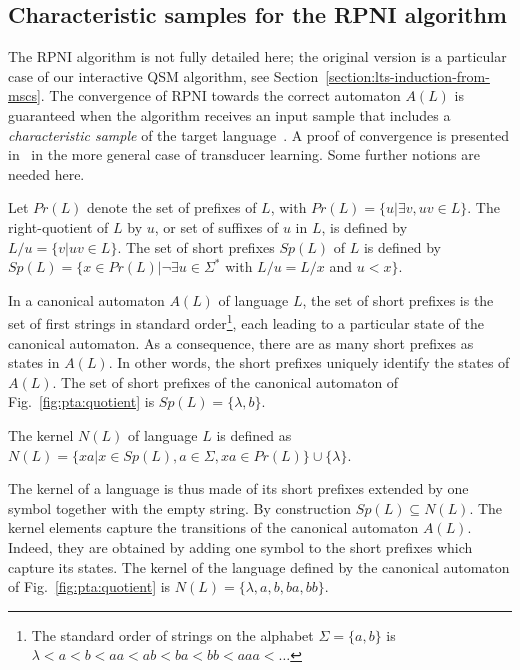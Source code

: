 \subsection{Characteristic samples for the RPNI algorithm\label{subsection:gi-background-rpni}}

The RPNI algorithm is not fully detailed here; the original version is a particular case of our interactive \textsc{QSM} algorithm, see Section~\ref{section:lts-induction-from-mscs}. The convergence of RPNI towards the correct automaton $A(L)$ is guaranteed when the algorithm receives an input sample that includes a \textsl{characteristic sample} of the target language~\cite{Oncina:1992}. A proof of convergence is presented in~\cite{Oncina:1993} in the more general case of transducer learning. Some further notions are needed here.

\begin{definition} 
Let $Pr(L)$ denote the set of prefixes of $L$, with $Pr(L) = \{u | \exists v, uv \in L\}$. The right-quotient of $L$ by $u$, or set of suffixes of $u$ in $L$, is defined by $L/u = \{v | uv \in L\}$. The set of short prefixes $Sp(L)$ of $L$ is defined by $Sp(L) = \{x \in Pr(L) | \neg\exists u \in \Sigma^*$ with $L/u = L/x$ and $u < x\}$.
\end{definition}

In a canonical automaton $A(L)$ of language $L$, the set of short prefixes is the set of first strings in standard order\footnote{The standard order of strings on the alphabet $\Sigma=\{a,b\}$ is $\lambda < a < b < aa < ab < ba < bb < aaa < \ldots$}, each leading to a particular state of the canonical automaton. As a consequence, there are as many short prefixes as states in $A(L)$. In other words, the short prefixes uniquely identify the states of $A(L)$. The set of short prefixes of the canonical automaton of Fig.~\ref{fig:pta:quotient} is $Sp(L) = \{\lambda, b\}$.

\begin{definition}
 The kernel $N(L)$ of language $L$ is defined as $N(L) = \{xa | x \in Sp(L), a \in \Sigma, xa \in Pr(L)\} \cup \{\lambda\}$.
\end{definition}

The kernel of a language is thus made of its short prefixes extended by one symbol together with the empty string. By construction $Sp(L) \subseteq N(L)$. The kernel elements capture the transitions of the canonical automaton $A(L)$. Indeed, they are obtained by adding one symbol to the short prefixes which capture its states. The kernel of the language defined by the canonical automaton of Fig.~\ref{fig:pta:quotient} is $N(L) = \{\lambda, a, b, ba, bb\}$.

